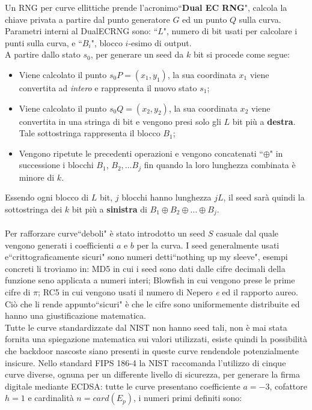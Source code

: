 \documentclass[a4paper,12pt]{tesiinfo}
\begin{document}
Un RNG per curve ellittiche prende l'acronimo``\textbf{Dual EC RNG}", calcola la chiave privata a partire dal punto generatore $G$ ed un punto $Q$ sulla curva. Parametri interni al DualECRNG sono: ``$L$", numero di bit usati per calcolare i punti sulla curva, e ``$B_i$", blocco $i$-esimo di output.
\\
A partire dallo stato $s_0$, per generare un seed da $k$ bit si procede come segue: 
\begin{itemize}
  \item Viene calcolato il punto $s_0P = (x_1, y_1)$, la sua coordinata $x_1$ viene convertita ad \textit{intero} e rappresenta il nuovo stato $s_1$;
  \item Viene calcolato il punto $s_0Q = (x_2, y_2)$, la sua coordinata $x_2$ viene convertita in una stringa di bit e vengono presi solo gli $L$ bit pi\`u a \textbf{destra}. Tale sottostringa rappresenta il blocco $B_1$;
  \item Vengono ripetute le precedenti operazioni e vengono concatenati ``$\oplus$" in successione i blocchi $B_1$, $B_2, \ldots B_j$ fin quando la loro lunghezza combinata \`e minore di $k$. 
\end{itemize}
Essendo ogni blocco di $L$ bit, $j$ blocchi hanno lunghezza $jL$, il seed sar\`a quindi la sottostringa dei $k$ bit pi\`u a \textbf{sinistra} di $B_1 \oplus B_2 \oplus \ldots \oplus B_j$.
\\
\\
Per rafforzare curve``deboli" \`e stato introdotto un seed $S$ casuale dal quale vengono generati i coefficienti $a$ e $b$ per la curva. I seed generalmente usati e``crittograficamente sicuri" sono numeri detti``nothing up my sleeve", esempi concreti li troviamo in: MD5 in cui i seed sono dati dalle cifre decimali della funzione seno applicata a numeri interi; Blowfish in cui vengono prese le prime cifre di $\pi$; RC5 in cui vengono usati il numero di Nepero \textit{e} ed il rapporto aureo. Ci\`o che li rende appunto``sicuri" \`e che le cifre sono uniformemente distribuite ed hanno una giustificazione matematica. 
\\
Tutte le curve standardizzate dal NIST non hanno seed tali, non \`e mai stata fornita una spiegazione matematica sui valori utilizzati, esiste quindi la possibilit\`a che backdoor nascoste siano presenti in queste curve rendendole potenzialmente insicure. Nello standard FIPS 186-4 la NIST raccomanda l'utilizzo di cinque curve diverse, ognuna per un differente livello di sicurezza, per generare la firma digitale mediante ECDSA: tutte le curve presentano coefficiente $a=-3$, cofattore $h=1$ e cardinalit\`a $n=card(E_p)$, i numeri primi definiti sono:
\end{document}
